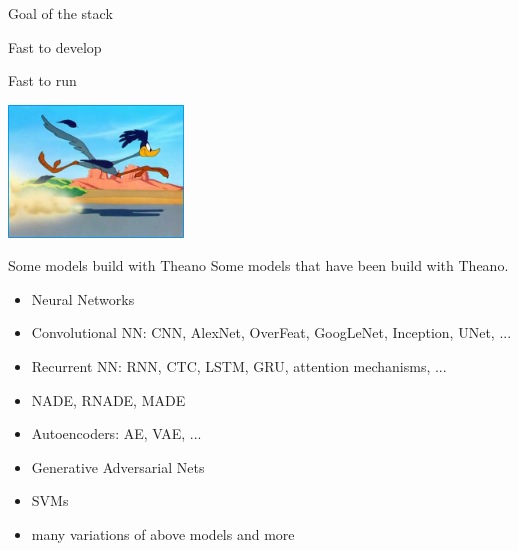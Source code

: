 \documentclass[utf8x,xcolor=pdftex,dvipsnames,table]{beamer}
\begin{document}
\begin{frame}{Goal of the stack}
\begin{center}
\begin{bf}Fast to develop\end{bf}\newline \bigskip
\begin{bf}Fast to run\end{bf}\newline \bigskip
\hspace{-2.5cm}
\includegraphics[width=0.35\textwidth]{pics/road-runner-1.jpg}
\end{center}
\end{frame}

\begin{frame}{Some models build with Theano}
  Some models that have been build with Theano.
  \begin{itemize}
  \item Neural Networks
  \item Convolutional NN: CNN, AlexNet, OverFeat, GoogLeNet, Inception, UNet, ...
  \item Recurrent NN: RNN, CTC, LSTM, GRU, attention mechanisms, ...
  \item NADE, RNADE, MADE
  \item Autoencoders: AE, VAE, ...
  \item Generative Adversarial Nets
  \item SVMs
  \item \begin{bf}many variations of above models and more\end{bf}
  \end{itemize}
\end{frame}

\end{document}

